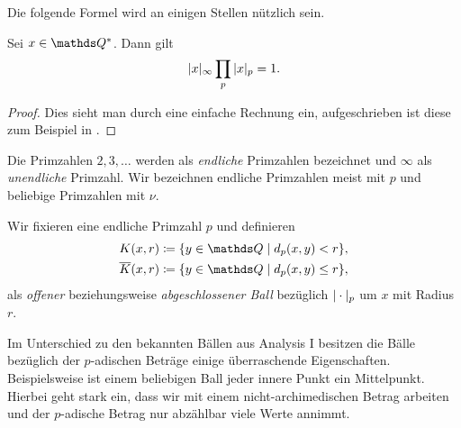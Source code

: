 Die folgende Formel wird an einigen Stellen nützlich sein.

\begin{satz}[Produktformel]
Sei $x\in \Q^\ast$. Dann gilt
\begin{align*}
|x|_\infty \prod_p |x|_p=1.
\end{align*}
\end{satz}
\begin{proof}
Dies sieht man durch eine einfache Rechnung ein, aufgeschrieben ist diese zum Beispiel in \cite[Proposition 4.1.4]{Deitmar}.
\end{proof}


\begin{bem}
Die Primzahlen $2,3,\dots$ werden als \emph{endliche} Primzahlen bezeichnet und $\infty$ als \emph{unendliche} Primzahl.
Wir bezeichnen endliche Primzahlen meist mit $p$ und beliebige Primzahlen mit $\nu$.
\end{bem}

\begin{defi}
Wir fixieren eine endliche Primzahl $p$ und definieren
\begin{align*}
K(x,r)\coloneqq\{y \in \Q \mid d_p(x,y)<r\},\\
\overline{K}(x,r) \coloneqq \{y\in \Q \mid d_p(x,y)\leq r\},
\end{align*}
als \emph{offener} beziehungsweise \emph{abgeschlossener Ball}
bezüglich $|\cdot|_p$ um $x$ mit Radius $r$.
\end{defi}

Im Unterschied zu den bekannten Bällen aus Analysis I besitzen die Bälle
bezüglich der $p$-adischen Beträge einige überraschende Eigenschaften.
Beispielsweise ist einem beliebigen Ball jeder innere Punkt ein Mittelpunkt.
Hierbei geht stark ein, dass wir mit einem nicht-archimedischen Betrag arbeiten und der $p$-adische Betrag
nur abzählbar viele Werte annimmt.


